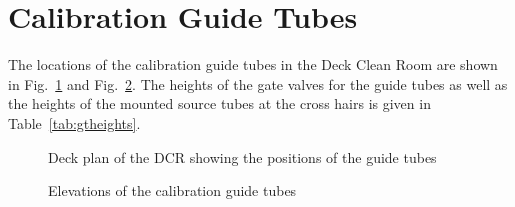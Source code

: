 \section{Calibration Guide Tubes}

The locations of the calibration guide tubes in the Deck Clean Room
are shown in Fig.~\ref{fig:deckplan} and Fig.~\ref{fig:gtelev}. The
heights of the gate valves for the guide tubes as well as the heights
of the mounted source tubes at the cross hairs is given in
Table~\ref{tab:gtheights}.

\begin{figure}

  \caption{Deck plan of the DCR showing the positions of the guide
    tubes}
  \label{fig:deckplan}
\end{figure}

\begin{figure}

  \caption{Elevations of the calibration guide tubes}
  \label{fig:gtelev}
\end{figure}
